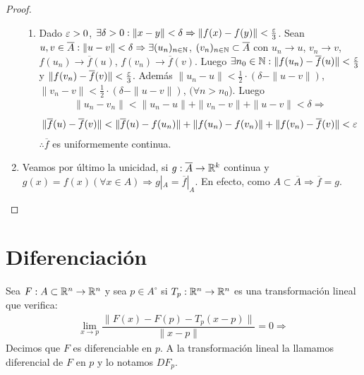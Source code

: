\begin{theorem}
\begin{proof}
\begin{enumerate}
\begin{enumerate}
              \item Dado \(\varepsilon > 0\), \(\exists \delta > 0 : \|x-y\| < \delta \Rightarrow \|f(x) - f(y)\| < \frac{\varepsilon}{3}\). Sean \(u, v \in \overline{A} : \|u - v\| < \delta \Rightarrow \exists (u_n)_{n \in \mathbb{N}}\), \((v_n)_{n \in \mathbb{N}} \subset \overline{A}\) con \(u_n \to u\), \(v_n \to v\), \(f(u_n) \to \overline{f}(u)\), \(f(v_n) \to \overline{f}(v)\). Luego \(\exists n_0 \in \mathbb{N} : \|f(u_n) - \overline{f}(u)\| < \frac{\varepsilon}{3}\) y \(\|f(v_n) - \overline{f}(v)\| < \frac{\varepsilon}{3}\). Además \(\|u_n - u\| < \frac{1}{2} \cdot (\delta - \|u - v\|)\), \(\|v_n - v\| < \frac{1}{2} \cdot (\delta - \|u - v\|)\), \((\forall n > n_0\)). Luego \begin{align*}
                      \|u_n - v_n\| < \|u_n - u\| + \|v_n - v\| + \|u - v\| < \delta \Rightarrow
                    \end{align*}
                    \begin{align*}
                      \|\overline{f}(u) - \overline{f}(v)\| < \|\overline{f}(u) - f(u_n)\| + \|f(u_n) - f(v_n)\| + \|f(v_n) - \overline{f}(v)\| < \varepsilon
                    \end{align*} \(\therefore \overline{f}\) es uniformemente continua.
            \end{enumerate}
      \item Veamos por último la unicidad, si \(g: \overline{A} \to \mathbb{R}^k\) continua y \(g(x) = f(x) (\forall x \in A) \Rightarrow g|_A = \overline{f}|_A\). En efecto, como \(A \subset \overline{A} \Rightarrow \overline{f} = g\).
    \end{enumerate}
  \end{proof}
\end{theorem}

\section{Diferenciación}

\begin{definition}
  Sea \(F : A \subset \mathbb{R}^n \to \mathbb{R}^n\) y sea \(p \in A^{\circ}\) si \(T_p : \mathbb{R}^n \to \mathbb{R}^n\) es una transformación lineal que verifica:
  \begin{align*}
    \lim_{x \to p} \dfrac{\| F(x) - F(p) - T_p(x-p) \|}{\|x-p\|} = 0 \Rightarrow
  \end{align*} Decimos que \(F\) es diferenciable en \(p\). A la transformación lineal la llamamos diferencial de \(F\) en \(p\) y lo notamos \(DF_p\).
\end{definition}

